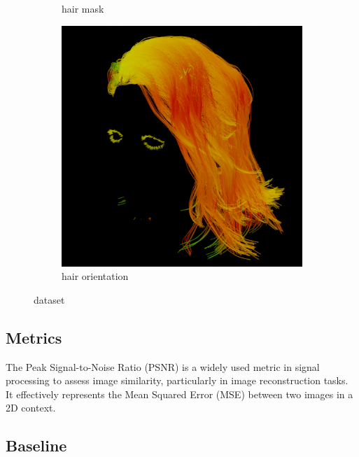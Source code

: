 \documentclass[12pt]{article}
\begin{document}
\begin{figure}[h]
\begin{subfigure}{0.24\textwidth}
\caption{hair mask}
\end{subfigure}
\hfill
\begin{subfigure}{0.24\textwidth}
\centering
\includegraphics[width=\textwidth]{./images/0009_hairdir.png}
\caption{hair orientation}
\end{subfigure}

\caption{dataset}
\label{fig:dataset}
\end{figure}

\subsection{Metrics}

The Peak Signal-to-Noise Ratio (PSNR) is a widely used metric in signal processing to assess image similarity, particularly in image reconstruction tasks. It effectively represents the Mean Squared Error (MSE) between two images in a 2D context.

\subsection{Baseline}
\end{document}
